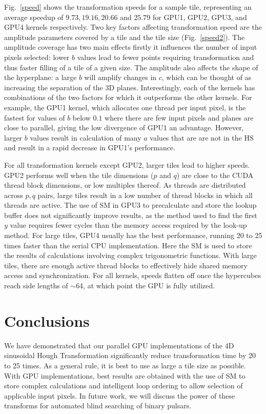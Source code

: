 Fig.~\ref{speed} shows the transformation speeds for a sample tile, representing an average speedup of $9.73, 19.16, 20.66$ and $25.79$ for GPU1, GPU2, GPU3, and GPU4  kernels respectively. Two key factors affecting transformation speed are the amplitude parameters covered by a tile and the tile size (Fig.~\ref{speed2}). The amplitude coverage has two main effects firstly it influences the number of input pixels selected: lower $b$ values lead to fewer points requiring transformation and thus faster filling of a tile of a given size. The amplitude also affects the shape of the hyperplane: a large $b$ will amplify changes in $c$, which can be thought of as increasing the separation of the 3D planes. Interestingly, each of the kernels has combinations of the two factors for which it outperforms the other kernels. For example, the GPU1 kernel, which allocates one thread per input pixel, is the fastest for values of $b$ below $0.1$ where there are few input pixels and planes are close to parallel, giving the low divergence of GPU1 an advantage. However, larger $b$ values result in  calculation of many $a$ values that are are not in the HS and result in a rapid decrease in GPU1's performance.

For all transformation kernels except GPU2, larger tiles lead to higher speeds. GPU2 performs well when the tile dimensions ($p$ and $q$) are close to the CUDA thread block dimensions, or low multiples thereof. As threads are distributed across $p,q$ pairs, large tiles result in a low number of thread blocks in which all threads are active. The use of SM in GPU3 to precalculate and store the lookup buffer does not significantly improve results, as the method used to find the first $y$ value requires fewer cycles than the memory access required by the look-up method. For large tiles, GPU4 usually has the best performance, running  20 to 25 times faster than the serial CPU implementation. Here the SM is used to store the results of calculations involving complex trigonometric functions. With large tiles, there are enough active thread blocks to effectively hide shared memory access and synchronization. For all kernels, speeds flatten off once the hypercubes reach side lengths of $\sim$64, at which point the GPU is fully utilized.

\section{Conclusions}
\label{Conclusion}

We have demonstrated that our parallel GPU implementations of the 4D sinusoidal Hough Transformation significantly reduce transformation time by 20 to 25 times. As a general rule, it is best to use as large a tile size as possible. With GPU implementations, best results are obtained with the use of SM to store complex calculations and intelligent loop ordering to allow selection of applicable input pixels. In future work, we will discuss the power of these transforms for automated blind searching of binary pulsars.  


